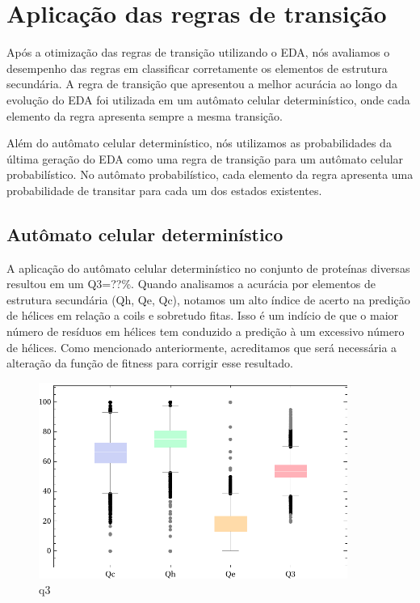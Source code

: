 \chapter{Aplicação das regras de transição}

Após a otimização das regras de transição utilizando o EDA, nós avaliamos o desempenho das regras em classificar corretamente os elementos de estrutura secundária. A regra de transição que apresentou a melhor acurácia ao longo da evolução do EDA foi utilizada em um autômato celular determinístico, onde cada elemento da regra apresenta sempre a mesma transição.

Além do autômato celular determinístico, nós utilizamos as probabilidades da última geração do EDA como uma regra de transição para um autômato celular probabilístico. No autômato probabilístico, cada elemento da regra apresenta uma probabilidade de transitar para cada um dos estados existentes.

\section{Autômato celular determinístico}

A aplicação do autômato celular determinístico no conjunto de proteínas diversas resultou em um Q3=??\%. Quando analisamos a acurácia por elementos de estrutura secundária (Qh, Qe, Qc), notamos um alto índice de acerto na predição de hélices em relação a coils e sobretudo fitas. Isso é um indício de que o maior número de resíduos em hélices tem conduzido a predição à um excessivo número de hélices. Como mencionado anteriormente, acreditamos que será necessária a alteração da função de fitness para corrigir esse resultado.

\begin{figure}
	\centering
	\includegraphics[width=0.9\textwidth]{figures/q3.pdf}
	\caption{q3}
	\label{fig:q3}
\end{figure}


